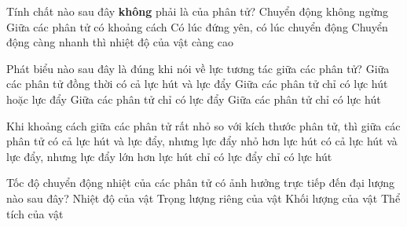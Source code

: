 	\begin{ex}%
		Tính chất nào sau đây \textbf{không} phải là của phân tử?
		\choice
		{Chuyển động không ngừng}
		{Giữa các phân tử có khoảng cách}
		{\True Có lúc đứng yên, có lúc chuyển động}
		{Chuyển động càng nhanh thì nhiệt độ của vật càng cao}
		\end{ex}
\begin{ex}%
	Phát biểu nào sau đây là đúng khi nói về lực tương tác giữa các phân tử?
	\choice
	{\True Giữa các phân tử đồng thời có cả lực hút và lực đẩy}
	{Giữa các phân tử chỉ có lực hút hoặc lực đẩy}
	{Giữa các phân tử chỉ có lực đẩy}
	{Giữa các phân tử chỉ có lực hút}
	\end{ex}
	\begin{ex}%
		Khi khoảng cách giữa các phân tử rất nhỏ so với kích thước phân tử, thì giữa các phân tử
		\choice
		{có cả lực hút và lực đẩy, nhưng lực đẩy nhỏ hơn lực hút}
		{\True có cả lực hút và lực đẩy, nhưng lực đẩy lớn hơn lực hút}
		{chỉ có lực đẩy}
		{chỉ có lực hút}	
		\end{ex}
\begin{ex}%
	Tốc độ chuyển động nhiệt của các phân tử có ảnh hưởng trực tiếp đến đại lượng nào sau đây?
	\choice
	{\True Nhiệt độ của vật}
	{Trọng lượng riêng của vật}
	{Khối lượng của vật}
	{Thể tích của vật}
\end{ex}

